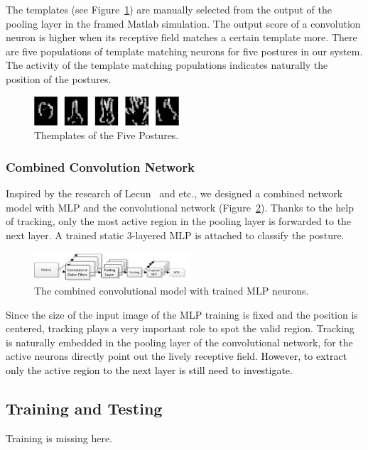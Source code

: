 \documentclass[journal]{journal}
\begin{document}
The templates (see Figure~\ref{fig:template}) are manually selected from the output of the pooling layer in the framed Matlab simulation. 
The output score of a convolution neuron is higher when its receptive field matches a certain template more. 
There are five populations of template matching neurons for five postures in our system. 
The activity of the template matching populations indicates naturally the position of the postures.

\begin{figure}
\centering
	\includegraphics[width=0.48\textwidth]{pics/gesture.pdf}
	\caption{Themplates of the Five Postures.}
	\label{fig:template}
\end{figure}

\subsubsection{Combined Convolution Network}
Inspired by the research of Lecun~\cite{lecun1998gradient} and etc., we designed a combined network model with MLP and the convolutional network (Figure~\ref{fig:model2}). 
Thanks to the help of tracking, only the most active region in the pooling layer is forwarded to the next layer. 
A trained static 3-layered MLP is attached to classify the posture.

\begin{figure}
\centering
	\includegraphics[width=0.52\textwidth]{pics/model2.pdf}
	\caption{The combined convolutional model with trained MLP neurons.}
	\label{fig:model2}
\end{figure}

Since the size of the input image of the MLP training is fixed and the position is centered, tracking plays a very important role to spot the valid region. 
Tracking is naturally embedded in the pooling layer of the convolutional network, for the active neurons directly point out the lively receptive field. 
\textcolor{black}{However, to extract only the active region to the next layer is still need to investigate.}

\subsection{Training and Testing}
\label{sec:tat}
Training is missing here.
\end{document}
